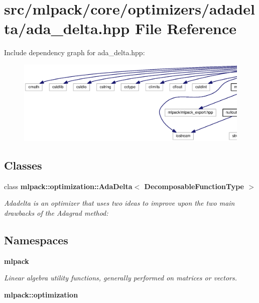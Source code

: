 \section{src/mlpack/core/optimizers/adadelta/ada\+\_\+delta.hpp File Reference}
\label{ada__delta_8hpp}
Include dependency graph for ada\+\_\+delta.\+hpp\+:
\nopagebreak
\begin{figure}[H]
\begin{center}
\leavevmode
\includegraphics[width=350pt]{ada__delta_8hpp__incl}
\end{center}
\end{figure}
\subsection*{Classes}
\begin{DoxyCompactItemize}
\item 
class {\bf mlpack\+::optimization\+::\+Ada\+Delta$<$ Decomposable\+Function\+Type $>$}
\begin{DoxyCompactList}\small\item\em Adadelta is an optimizer that uses two ideas to improve upon the two main drawbacks of the Adagrad method\+: \end{DoxyCompactList}\end{DoxyCompactItemize}
\subsection*{Namespaces}
\begin{DoxyCompactItemize}
\item 
 {\bf mlpack}
\begin{DoxyCompactList}\small\item\em Linear algebra utility functions, generally performed on matrices or vectors. \end{DoxyCompactList}\item 
 {\bf mlpack\+::optimization}
\end{DoxyCompactItemize}


